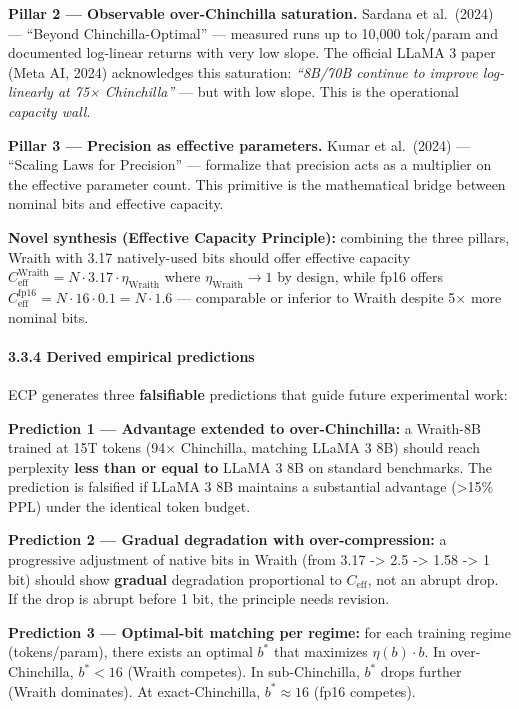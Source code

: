 \textbf{Pillar 2 --- Observable over-Chinchilla saturation.} Sardana et
al.~(2024) --- ``Beyond Chinchilla-Optimal'' --- measured runs up to
10,000 tok/param and documented log-linear returns with very low slope.
The official LLaMA 3 paper (Meta AI, 2024) acknowledges this saturation:
\emph{``8B/70B continue to improve log-linearly at 75× Chinchilla''} ---
but with low slope. This is the operational \emph{capacity wall}.

\textbf{Pillar 3 --- Precision as effective parameters.} Kumar et
al.~(2024) --- ``Scaling Laws for Precision'' --- formalize that
precision acts as a multiplier on the effective parameter count. This
primitive is the mathematical bridge between nominal bits and effective
capacity.

\textbf{Novel synthesis (Effective Capacity Principle):} combining the
three pillars, Wraith with 3.17 natively-used bits should offer
effective capacity
\(C_\text{eff}^\text{Wraith} = N \cdot 3.17 \cdot \eta_\text{Wraith}\)
where \(\eta_\text{Wraith} \to 1\) by design, while fp16 offers
\(C_\text{eff}^\text{fp16} = N \cdot 16 \cdot 0.1 = N \cdot 1.6\) ---
comparable or inferior to Wraith despite 5× more nominal bits.

\paragraph{3.3.4 Derived empirical
predictions}\label{derived-empirical-predictions}

ECP generates three \textbf{falsifiable} predictions that guide future
experimental work:

\textbf{Prediction 1 --- Advantage extended to over-Chinchilla:} a
Wraith-8B trained at 15T tokens (94× Chinchilla, matching LLaMA 3 8B)
should reach perplexity \textbf{less than or equal to} LLaMA 3 8B on
standard benchmarks. The prediction is falsified if LLaMA 3 8B maintains
a substantial advantage (\textgreater15\% PPL) under the identical token
budget.

\textbf{Prediction 2 --- Gradual degradation with over-compression:} a
progressive adjustment of native bits in Wraith (from 3.17 -> 2.5 -> 1.58
-> 1 bit) should show \textbf{gradual} degradation proportional to
\(C_\text{eff}\), not an abrupt drop. If the drop is abrupt before 1
bit, the principle needs revision.

\textbf{Prediction 3 --- Optimal-bit matching per regime:} for each
training regime (tokens/param), there exists an optimal \(b^*\) that
maximizes \(\eta(b) \cdot b\). In over-Chinchilla, \(b^* < 16\) (Wraith
competes). In sub-Chinchilla, \(b^*\) drops further (Wraith dominates).
At exact-Chinchilla, \(b^* \approx 16\) (fp16 competes).

